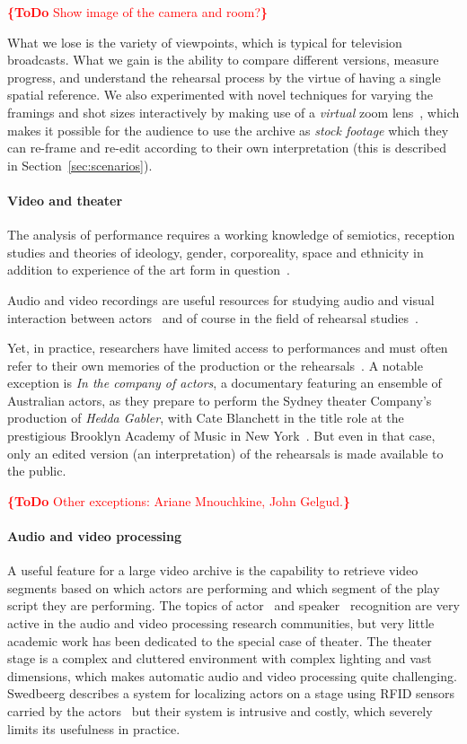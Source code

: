 \documentclass[conference]{IEEEtran}
\newcommand{\todo}[1]{\noindent\textcolor{red}{{\bf \{ToDo} #1{\bf \}}}}
\begin{document}
\todo{Show image of the camera and room?}

What we lose is the variety of viewpoints, which is typical for television broadcasts. What we gain is the ability to compare different versions, measure progress, and understand the rehearsal process by the virtue of having a single spatial reference.
We also experimented with novel techniques for varying the framings and shot sizes interactively 
by making use of a {\em virtual}  zoom lens~\cite{Gandhi14}, which makes it possible for the audience to
use the archive as {\em stock footage} which they can re-frame and re-edit according to their own interpretation (this is described in Section~\ref{sec:scenarios}). 


\paragraph*{Video and theater}

The analysis of performance requires a working knowledge of semiotics, reception studies and theories 
of ideology, gender, corporeality, space and ethnicity in addition to experience of the art form in question~\cite{Auslander97,Counsell01}.

Audio and video recordings are useful resources for studying audio and visual interaction between actors~\cite{Fitzpatrick90}
and of course in the field of rehearsal studies~\cite{McAuley98a,McAuley98b,McAuley06,McAuley08}.

Yet, in practice, researchers have limited access to performances and must often refer to their own memories of the production or the rehearsals~\cite{Selbourne82,Sher85,Stafford00,Stern00}. A notable exception is {\em In the company of actors}, a documentary featuring an ensemble of Australian actors, as they prepare to perform the Sydney theater Company's production of \emph{Hedda Gabler}, with Cate Blanchett in the title role at the prestigious Brooklyn Academy of Music  in New York~\cite{Darling07}. But even in that case, only an edited version (an interpretation)  of the rehearsals is made available to the public. 

\todo{Other exceptions: Ariane Mnouchkine, John Gelgud.}

\paragraph*{Audio and video processing}
A useful feature for a large video archive is the capability to retrieve video segments based on which actors 
are performing and which segment of the play script they are performing. The topics of actor~\cite{Hilton06} and speaker~\cite{Miro12} recognition are very active in the audio and video processing research communities, but very little academic 
work has been dedicated to the special case of theater. The theater stage is a complex and cluttered environment 
with complex lighting and vast dimensions, which makes automatic audio and video processing quite challenging. 
Swedbeerg describes a system for localizing actors on a stage using RFID sensors carried by the actors~\cite{Swedberg}
but their system is intrusive and costly, which severely limits its usefulness in practice.
\end{document}
